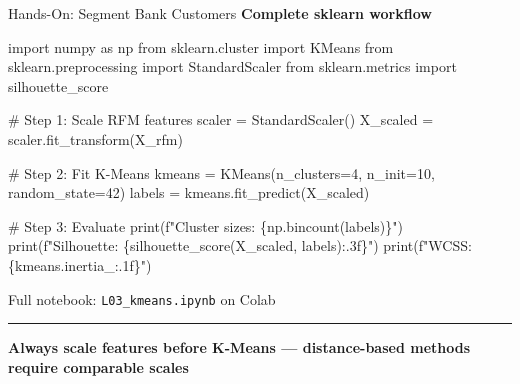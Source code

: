 \documentclass[8pt,aspectratio=169]{beamer}
\newcommand{\bottomnote}[1]{%
\vfill
\vspace{-2mm}
\textcolor{mllavender2}{\rule{\textwidth}{0.4pt}}
\vspace{1mm}
\footnotesize
\textbf{#1}
}
\begin{document}
\begin{frame}[fragile,t]{Hands-On: Segment Bank Customers}
\small
\textbf{Complete sklearn workflow}

\vspace{2mm}
\footnotesize
\begin{semiverbatim}
\textcolor{mlblue}{import} numpy \textcolor{mlblue}{as} np
\textcolor{mlblue}{from} sklearn.cluster \textcolor{mlblue}{import} KMeans
\textcolor{mlblue}{from} sklearn.preprocessing \textcolor{mlblue}{import} StandardScaler
\textcolor{mlblue}{from} sklearn.metrics \textcolor{mlblue}{import} silhouette_score

\textcolor{mlgray}{# Step 1: Scale RFM features}
scaler = StandardScaler()
X_scaled = scaler.fit_transform(X_rfm)

\textcolor{mlgray}{# Step 2: Fit K-Means}
kmeans = KMeans(n_clusters=4, n_init=10, random_state=42)
labels = kmeans.fit_predict(X_scaled)

\textcolor{mlgray}{# Step 3: Evaluate}
print(f\textcolor{mlorange}{"Cluster sizes: \{np.bincount(labels)\}"})
print(f\textcolor{mlorange}{"Silhouette:    \{silhouette_score(X_scaled, labels):.3f\}"})
print(f\textcolor{mlorange}{"WCSS:          \{kmeans.inertia_:.1f\}"})
\end{semiverbatim}

\vspace{2mm}
\footnotesize
Full notebook: \texttt{L03\_kmeans.ipynb} on Colab
\bottomnote{Always scale features before K-Means --- distance-based methods require comparable scales}
\end{frame}
\end{document}
